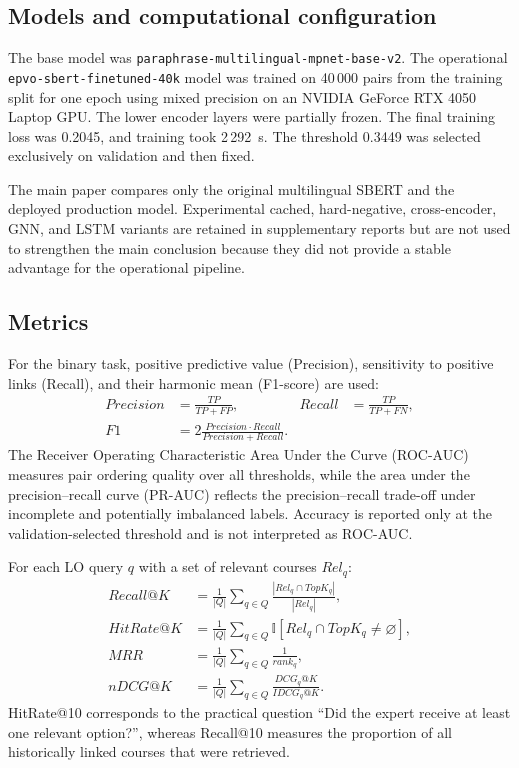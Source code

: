 \documentclass[twoside,11pt]{article}
\newcommand{\epvomodel}{\texttt{epvo-sbert-\allowbreak finetuned-40k}}
\begin{document}
\subsection{Models and computational configuration}

The base model was \texttt{paraphrase-multilingual-mpnet-base-v2}. The operational \epvomodel{} model was trained on 40\,000 pairs from the training split for one epoch using mixed precision on an NVIDIA GeForce RTX 4050 Laptop GPU. The lower encoder layers were partially frozen. The final training loss was 0.2045, and training took 2\,292~s. The threshold 0.3449 was selected exclusively on validation and then fixed.

The main paper compares only the original multilingual SBERT and the deployed production model. Experimental cached, hard-negative, cross-encoder, GNN, and LSTM variants are retained in supplementary reports but are not used to strengthen the main conclusion because they did not provide a stable advantage for the operational pipeline.

\subsection{Metrics}

For the binary task, positive predictive value (Precision), sensitivity to positive links (Recall), and their harmonic mean (F1-score) are used:
\begin{align}
  Precision &= \frac{TP}{TP+FP}, &
  Recall &= \frac{TP}{TP+FN},\\
  F1 &= 2\frac{Precision\cdot Recall}{Precision+Recall}.
  \label{eq:classification-metrics-v2}
\end{align}
The Receiver Operating Characteristic Area Under the Curve (ROC-AUC) measures pair ordering quality over all thresholds, while the area under the precision--recall curve (PR-AUC) reflects the precision--recall trade-off under incomplete and potentially imbalanced labels. Accuracy is reported only at the validation-selected threshold and is not interpreted as ROC-AUC.

For each LO query $q$ with a set of relevant courses $Rel_q$:
\begin{align}
 Recall@K &= \frac{1}{|Q|}\sum_{q\in Q}\frac{|Rel_q\cap TopK_q|}{|Rel_q|},\\
 HitRate@K &= \frac{1}{|Q|}\sum_{q\in Q}\mathbb{I}[Rel_q\cap TopK_q\neq\varnothing],\\
 MRR &= \frac{1}{|Q|}\sum_{q\in Q}\frac{1}{rank_q},\\
 nDCG@K &= \frac{1}{|Q|}\sum_{q\in Q}\frac{DCG_q@K}{IDCG_q@K}.
 \label{eq:ranking-metrics-v2}
\end{align}
HitRate@10 corresponds to the practical question ``Did the expert receive at least one relevant option?'', whereas Recall@10 measures the proportion of all historically linked courses that were retrieved.
\end{document}

